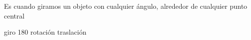 
\question Es cuando giramos un objeto con cualquier ángulo, alrededor de
cualquier punto central 

  \begin{oneparchoices}
    \choice giro 180 
    \CorrectChoice rotación
    \choice traslación 
  \end{oneparchoices}
